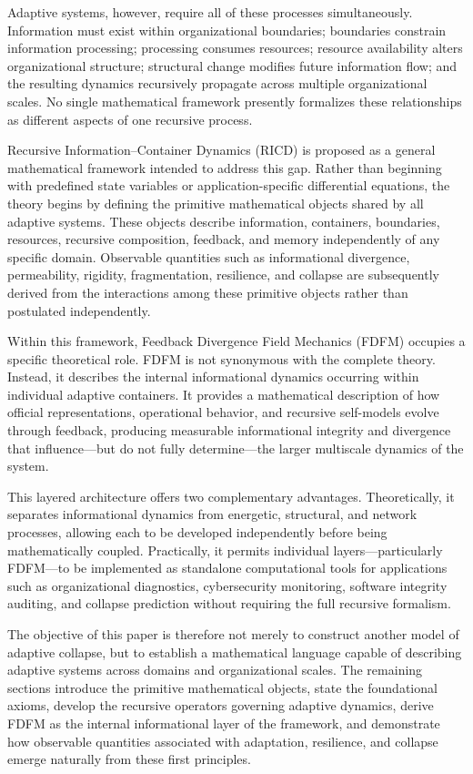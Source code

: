 \documentclass[
]{article}
\begin{document}
Adaptive systems, however, require all of these processes
simultaneously. Information must exist within organizational boundaries;
boundaries constrain information processing; processing consumes
resources; resource availability alters organizational structure;
structural change modifies future information flow; and the resulting
dynamics recursively propagate across multiple organizational scales. No
single mathematical framework presently formalizes these relationships
as different aspects of one recursive process.

Recursive Information--Container Dynamics (RICD) is proposed as a
general mathematical framework intended to address this gap. Rather than
beginning with predefined state variables or application-specific
differential equations, the theory begins by defining the primitive
mathematical objects shared by all adaptive systems. These objects
describe information, containers, boundaries, resources, recursive
composition, feedback, and memory independently of any specific domain.
Observable quantities such as informational divergence, permeability,
rigidity, fragmentation, resilience, and collapse are subsequently
derived from the interactions among these primitive objects rather than
postulated independently.

Within this framework, Feedback Divergence Field Mechanics (FDFM)
occupies a specific theoretical role. FDFM is not synonymous with the
complete theory. Instead, it describes the internal informational
dynamics occurring within individual adaptive containers. It provides a
mathematical description of how official representations, operational
behavior, and recursive self-models evolve through feedback, producing
measurable informational integrity and divergence that influence---but
do not fully determine---the larger multiscale dynamics of the system.

This layered architecture offers two complementary advantages.
Theoretically, it separates informational dynamics from energetic,
structural, and network processes, allowing each to be developed
independently before being mathematically coupled. Practically, it
permits individual layers---particularly FDFM---to be implemented as
standalone computational tools for applications such as organizational
diagnostics, cybersecurity monitoring, software integrity auditing, and
collapse prediction without requiring the full recursive formalism.

The objective of this paper is therefore not merely to construct another
model of adaptive collapse, but to establish a mathematical language
capable of describing adaptive systems across domains and organizational
scales. The remaining sections introduce the primitive mathematical
objects, state the foundational axioms, develop the recursive operators
governing adaptive dynamics, derive FDFM as the internal informational
layer of the framework, and demonstrate how observable quantities
associated with adaptation, resilience, and collapse emerge naturally
from these first principles.
\end{document}
